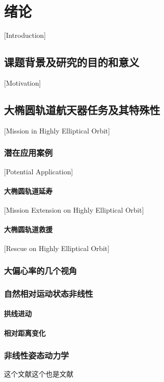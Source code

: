
\chapter[绪论]{绪论}[Introduction]

\section{课题背景及研究的目的和意义}[Motivation]

\section{大椭圆轨道航天器任务及其特殊性}[Mission in Highly Elliptical Orbit]

\subsection{潜在应用案例}[Potential Application]

\subsubsection{大椭圆轨道延寿}[Mission Extension on Highly Elliptical Orbit]

\subsubsection{大椭圆轨道救援}[Rescue on Highly Elliptical Orbit]

\subsection{大偏心率的几个视角}
\subsection{自然相对运动状态非线性}
\subsubsection{拱线进动}
\subsubsection{相对距离变化}
\subsection{非线性姿态动力学}
这个文献\cite{hintz_orbital_2015}这个也是文献\cite{gurfil_celestial_2016}
